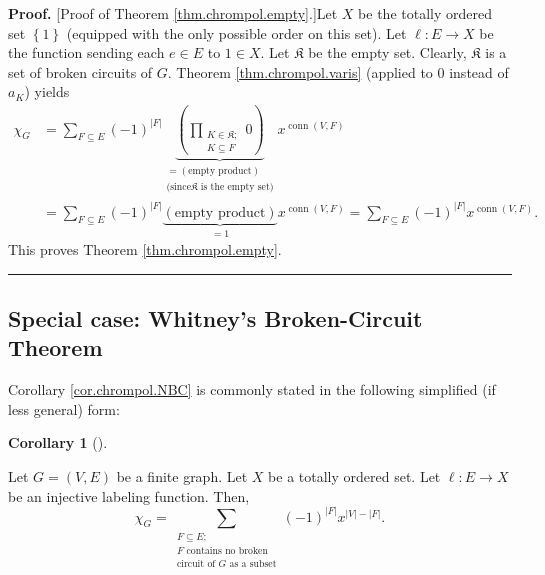 \documentclass[numbers=enddot,12pt,final,onecolumn,notitlepage]{scrartcl}%
\theoremstyle{definition}
\newtheorem{coro}[theo]{Corollary}
\newenvironment{corollary}[1][]
{\begin{coro}[#1]\begin{leftbar}}
{\end{leftbar}\end{coro}}
\newenvironment{proof}[1][Proof]{\noindent\textbf{#1.} }{\ \rule{0.5em}{0.5em}}
\newenvironment{verlong}{}{}
\let\sumnonlimits\sum
\let\prodnonlimits\prod
\renewcommand{\sum}{\sumnonlimits\limits}
\renewcommand{\prod}{\prodnonlimits\limits}
\begin{document}
\begin{verlong}
\begin{proof}
[Proof of Theorem \ref{thm.chrompol.empty}.]Let $X$ be the totally ordered set
$\left\{  1\right\}  $ (equipped with the only possible order on this set).
Let $\ell:E\rightarrow X$ be the function sending each $e\in E$ to $1\in X$.
Let $\mathfrak{K}$ be the empty set. Clearly, $\mathfrak{K}$ is a set of
broken circuits of $G$. Theorem \ref{thm.chrompol.varis} (applied to $0$
instead of $a_{K}$) yields%
\begin{align*}
\chi_{G}  &  =\sum_{F\subseteq E}\left(  -1\right)  ^{\left\vert F\right\vert
}\underbrace{\left(  \prod_{\substack{K\in\mathfrak{K};\\K\subseteq
F}}0\right)  }_{\substack{=\left(  \text{empty product}\right)  \\\text{(since
}\mathfrak{K}\text{ is the empty set)}}}x^{\operatorname*{conn}\left(
V,F\right)  }\\
&  =\sum_{F\subseteq E}\left(  -1\right)  ^{\left\vert F\right\vert
}\underbrace{\left(  \text{empty product}\right)  }_{=1}%
x^{\operatorname*{conn}\left(  V,F\right)  }=\sum_{F\subseteq E}\left(
-1\right)  ^{\left\vert F\right\vert }x^{\operatorname*{conn}\left(
V,F\right)  }.
\end{align*}
This proves Theorem \ref{thm.chrompol.empty}.
\end{proof}
\end{verlong}

\subsection{Special case: Whitney's Broken-Circuit Theorem}

Corollary \ref{cor.chrompol.NBC} is commonly stated in the following
simplified (if less general) form:

\Needspace{4cm}

\begin{corollary}
\label{cor.chrompol.NBCfor}Let $G=\left(  V,E\right)  $ be a finite graph. Let
$X$ be a totally ordered set. Let $\ell:E\rightarrow X$ be an injective
labeling function. Then,%
\[
\chi_{G}=\sum_{\substack{F\subseteq E;\\F\text{ contains no broken}%
\\\text{circuit of }G\text{ as a subset}}}\left(  -1\right)  ^{\left\vert
F\right\vert }x^{\left\vert V\right\vert -\left\vert F\right\vert }.
\]

\end{corollary}
\end{document}
